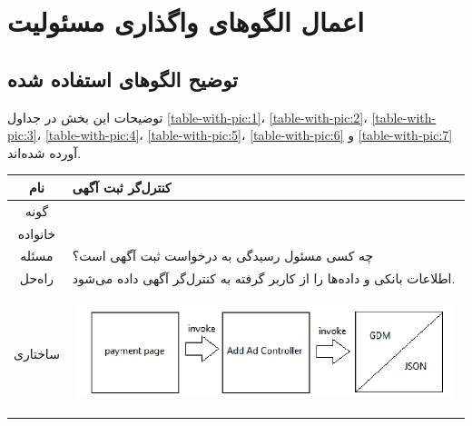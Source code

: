 \newcommand{\grasp}{\lr{GRASP}}
\newcommand{\controller}{\lr{Controller Pattern}}
\newcommand{\expert}{\lr{Expert Pattern}}

\chapter{اعمال الگو‌های واگذاری مسئولیت}
\section{توضیح الگو‌های استفاده شده}
توضیحات این بخش در جداول 
\ref{table-with-pic:1}،
\ref{table-with-pic:2}،
\ref{table-with-pic:3}،
\ref{table-with-pic:4}،
\ref{table-with-pic:5}،
\ref{table-with-pic:6} و 
\ref{table-with-pic:7}
آورده شده‌اند.

\begin{table}[H]
\begin{adjustbox}{width=\textwidth}
\begin{tabular}{|c|p{\textwidth}|}
\hline
نام &
کنترل‌گر ثبت آگهی \\ 
\hline
گونه & 
\grasp \\
\hline
خانواده &
\controller \\
\hline
مسئله & 
چه کسی مسئول رسیدگی به درخواست ثبت آگهی است؟\\
\hline
راه‌حل& 
اطلاعات بانکی و داده‌ها را از کاربر گرفته به کنترل‌گر آگهی داده می‌شود. \\
\hline
ساختاری & 
\begin{minipage}{\textwidth}
	\begin{flushleft}
		\begin{minipage}{\textwidth}
			\includegraphics[width=13cm, height=2.7cm]{./images/7-1-1}
		\end{minipage}
	\end{flushleft}
\end{minipage}
	

\end{tabular}
\end{adjustbox}
\end{table}
